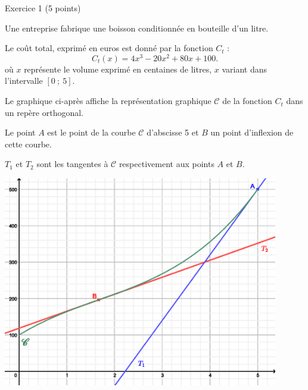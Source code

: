 
%
\begin{h2}Exercice 1 (5 points)\end{h2}
\par
Une entreprise fabrique une boisson conditionnée en bouteille d'un litre.
\par
Le coût total, exprimé en euros est donné par la fonction $C_t$ :
\[ C_t(x)=4x^3-20x^2+80x+100. \]
où $x$ représente le volume exprimé en centaines de litres, $x$ variant dans l'intervalle $[0~;~5]$.
\par
Le graphique ci-après affiche la représentation graphique $\mathscr{C}$ de la fonction $C_t$ dans un repère orthogonal.
\par
Le point $A$ est le point de la courbe $\mathscr{C}$ d'abscisse 5 et $B$ un point d'inflexion de cette courbe.
\par
$T_1$ et $T_2$ sont les tangentes à $\mathscr{C}$ respectivement aux points $A$ et $B$.
\par
\begin{center}
     \begin{extern}%
          \includegraphics[width=0.9\textwidth]{images/BBESL-s3-1-1}%
     \end{extern}
\end{center}


